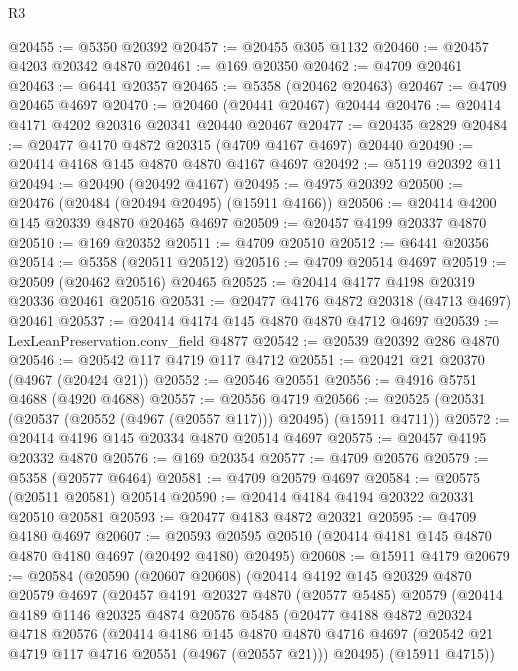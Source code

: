 \begin{lexlean}{R3}
\begin{coremodule}
@20455 := @5350 @20392
@20457 := @20455 @305 @1132
@20460 := @20457 @4203 @20342 @4870
@20461 := @169 @20350
@20462 := @4709 @20461
@20463 := @6441 @20357
@20465 := @5358 (@20462 @20463)
@20467 := @4709 @20465 @4697
@20470 := @20460 (@20441 @20467) @20444
@20476 := @20414 @4171 @4202 @20316 @20341 @20440 @20467
@20477 := @20435 @2829
@20484 := @20477 @4170 @4872 @20315 (@4709 @4167 @4697) @20440
@20490 := @20414 @4168 @145 @4870 @4870 @4167 @4697
@20492 := @5119 @20392 @11
@20494 := @20490 (@20492 @4167)
@20495 := @4975 @20392
@20500 := @20476 (@20484 (@20494 @20495) (@15911 @4166))
@20506 := @20414 @4200 @145 @20339 @4870 @20465 @4697
@20509 := @20457 @4199 @20337 @4870
@20510 := @169 @20352
@20511 := @4709 @20510
@20512 := @6441 @20356
@20514 := @5358 (@20511 @20512)
@20516 := @4709 @20514 @4697
@20519 := @20509 (@20462 @20516) @20465
@20525 := @20414 @4177 @4198 @20319 @20336 @20461 @20516
@20531 := @20477 @4176 @4872 @20318 (@4713 @4697) @20461
@20537 := @20414 @4174 @145 @4870 @4870 @4712 @4697
@20539 := LexLeanPreservation.conv_field @4877
@20542 := @20539 @20392 @286 @4870
@20546 := @20542 @117 @4719 @117 @4712
@20551 := @20421 @21 @20370 (@4967 (@20424 @21))
@20552 := @20546 @20551
@20556 := @4916 @5751 @4688 (@4920 @4688)
@20557 := @20556 @4719
@20566 := @20525 (@20531 (@20537 (@20552 (@4967 (@20557 @117))) @20495) (@15911 @4711))
@20572 := @20414 @4196 @145 @20334 @4870 @20514 @4697
@20575 := @20457 @4195 @20332 @4870
@20576 := @169 @20354
@20577 := @4709 @20576
@20579 := @5358 (@20577 @6464)
@20581 := @4709 @20579 @4697
@20584 := @20575 (@20511 @20581) @20514
@20590 := @20414 @4184 @4194 @20322 @20331 @20510 @20581
@20593 := @20477 @4183 @4872 @20321
@20595 := @4709 @4180 @4697
@20607 := @20593 @20595 @20510 (@20414 @4181 @145 @4870 @4870 @4180 @4697 (@20492 @4180) @20495)
@20608 := @15911 @4179
@20679 := @20584
    (@20590
      (@20607 @20608)
      (@20414
        @4192
        @145
        @20329
        @4870
        @20579
        @4697
        (@20457
          @4191
          @20327
          @4870
          (@20577 @5485)
          @20579
          (@20414
            @4189
            @1146
            @20325
            @4874
            @20576
            @5485
            (@20477
              @4188
              @4872
              @20324
              @4718
              @20576
              (@20414
                @4186
                @145
                @4870
                @4870
                @4716
                @4697
                (@20542 @21 @4719 @117 @4716 @20551 (@4967 (@20557 @21)))
                @20495)
              (@15911 @4715))

\end{coremodule}
\end{lexlean}
